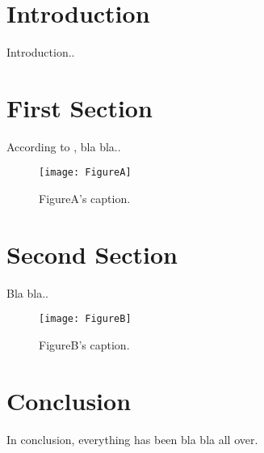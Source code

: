 \section{Introduction}

Introduction..

\section{First Section}

According to \cite{BibtexKey}, bla bla..

\begin{figure}[tbh]
\begin{center}
\noindent
  \texttt{[image: FigureA]}
  \end{center}
    \caption{FigureA's caption.}\label{FigureA}
\end{figure}

\section{Second Section}

Bla bla..

\begin{figure}[tbh]
\begin{center}
\noindent
  \texttt{[image: FigureB]}
  \end{center}
    \caption{FigureB's caption.}\label{FigureB}
\end{figure}

\section{Conclusion}

In conclusion, everything has been bla bla all over.
